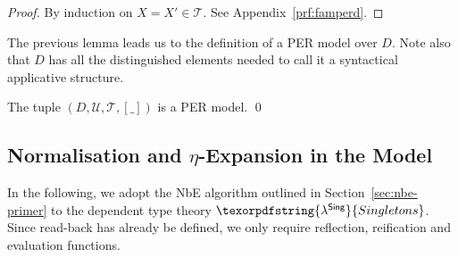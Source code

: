 \documentclass{LMCS}
\theoremstyle{plain}\newtheorem{satz}[thm]{Satz}
\newcommand{\LONGVERSION}[1]{#1}
\newcommand{\lambdaSing}{\texorpdfstring{\ensuremath{\lambda^{\mathsf{Sing}}}}{Singletons}}
\newcommand{\perU}{\mathcal{U}}
\newcommand{\perT}{\mathcal{T}}
\newcommand{\LONGVERSION}[1]{}
\begin{document}
\LONGVERSION{
  \begin{proof} By induction on $X = X' \in \perT$. 
See Appendix~\ref{prf:famperd}.
  \end{proof}

The previous lemma leads us to the definition of a PER model over
$D$. Note also that $D$ has all the distinguished elements needed to
call it a syntactical applicative structure.

\begin{cor}
  The tuple $(D, \perU, \perT, [\_])$ is a PER model. \qed
\end{cor}
}
\newcommand{\etatitle}{\texorpdfstring{$\eta$}{eta}}
\subsection{Normalisation and \etatitle-Expansion in the Model}
\label{sec:norm-model}



In the following, we adopt the NbE algorithm outlined in
Section~\ref{sec:nbe-primer} to the dependent type theory
$\lambdaSing$.  Since read-back has already be defined, we only
require reflection, reification and evaluation functions.
\end{document}
